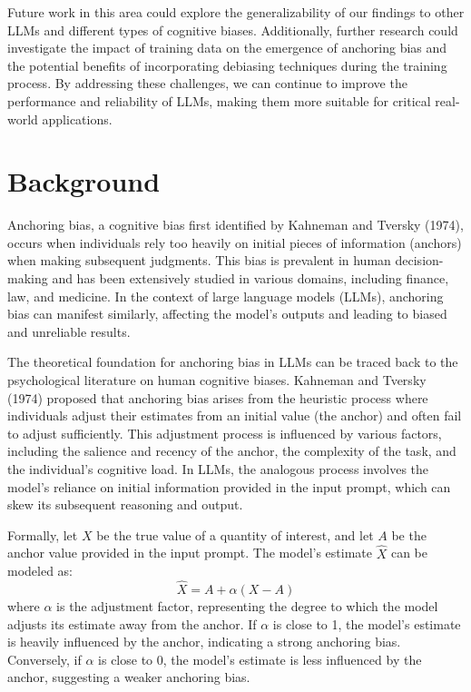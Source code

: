 \documentclass{article}
\begin{document}
Future work in this area could explore the generalizability of our findings to other LLMs and different types of cognitive biases. Additionally, further research could investigate the impact of training data on the emergence of anchoring bias and the potential benefits of incorporating debiasing techniques during the training process. By addressing these challenges, we can continue to improve the performance and reliability of LLMs, making them more suitable for critical real-world applications.

\section{Background}
Anchoring bias, a cognitive bias first identified by Kahneman and Tversky (1974), occurs when individuals rely too heavily on initial pieces of information (anchors) when making subsequent judgments. This bias is prevalent in human decision-making and has been extensively studied in various domains, including finance, law, and medicine. In the context of large language models (LLMs), anchoring bias can manifest similarly, affecting the model's outputs and leading to biased and unreliable results. 

The theoretical foundation for anchoring bias in LLMs can be traced back to the psychological literature on human cognitive biases. Kahneman and Tversky (1974) proposed that anchoring bias arises from the heuristic process where individuals adjust their estimates from an initial value (the anchor) and often fail to adjust sufficiently. This adjustment process is influenced by various factors, including the salience and recency of the anchor, the complexity of the task, and the individual's cognitive load. In LLMs, the analogous process involves the model's reliance on initial information provided in the input prompt, which can skew its subsequent reasoning and output.

Formally, let \( X \) be the true value of a quantity of interest, and let \( A \) be the anchor value provided in the input prompt. The model's estimate \( \hat{X} \) can be modeled as:
\[
\hat{X} = A + \alpha (X - A)
\]
where \( \alpha \) is the adjustment factor, representing the degree to which the model adjusts its estimate away from the anchor. If \( \alpha \) is close to 1, the model's estimate is heavily influenced by the anchor, indicating a strong anchoring bias. Conversely, if \( \alpha \) is close to 0, the model's estimate is less influenced by the anchor, suggesting a weaker anchoring bias.
\end{document}
